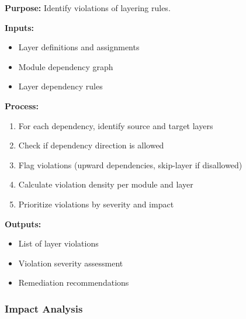 \documentclass[11pt,letterpaper]{article}
\begin{document}
\begin{definitionbox}
\textbf{Purpose:} Identify violations of layering rules.

\textbf{Inputs:}
\begin{itemize}[nosep]
    \item Layer definitions and assignments
    \item Module dependency graph
    \item Layer dependency rules
\end{itemize}

\textbf{Process:}
\begin{enumerate}[nosep]
    \item For each dependency, identify source and target layers
    \item Check if dependency direction is allowed
    \item Flag violations (upward dependencies, skip-layer if disallowed)
    \item Calculate violation density per module and layer
    \item Prioritize violations by severity and impact
\end{enumerate}

\textbf{Outputs:}
\begin{itemize}[nosep]
    \item List of layer violations
    \item Violation severity assessment
    \item Remediation recommendations
\end{itemize}
\end{definitionbox}

\subsubsection{Impact Analysis}
\end{document}
